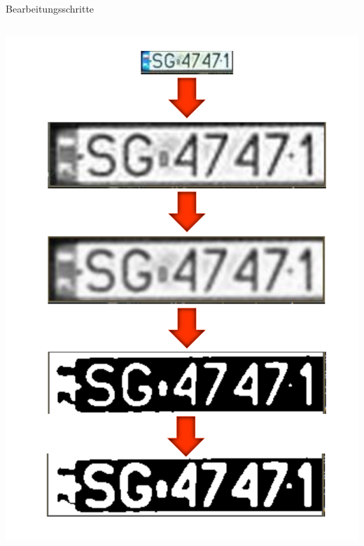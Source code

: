 \begin{frame}{Bearbeitungsschritte}
\begin{columns}
\begin{column}{0.40\textwidth}
\begin{center}
        \includegraphics[width=\textwidth]{img/preprocessing}
    \end{center}
\end{column}
\end{columns}
\end{frame}

